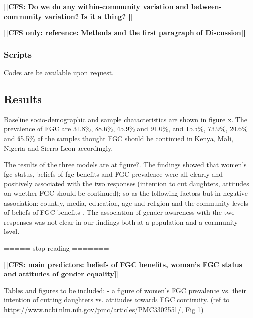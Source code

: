\documentclass[12pt,]{article}
\newcommand{\comment}[1]{\textbf{[[#1]]}}
\newcommand{\cfcmt}[1]{\comment{CFS: #1}}
\newcommand{\cfonly}[1]{\comment{CFS only: #1}}
\begin{document}
\cfcmt{Do we do any within-community variation and between-community variation?  Is it a thing? }

\cfonly{reference: Methods and the first paragraph of Discussion\cite{Chia14}}


\subsubsection{Scripts}\label{scripts}

Codes are be available upon request. 

\subsection{Results}\label{results-1}


Baseline socio-demographic and sample characteristics are shown in figure x.  The prevalence of FGC are 31.8\%, 88.6\%, 45.9\% and 91.0\%, and 15.5\%, 73.9\%, 20.6\% and 65.5\% of the samples thought FGC should be continued in Kenya, Mali, Nigeria and Sierra Leon accordingly.  

The results of the three models are at figure?.  The findings showed that women’s fgc status, beliefs of fgc benefits and FGC prevalence were all clearly and positively associated with the two responses (intention to cut daughters, attitudes on whether FGC should be continued); so as the following factors but in negative association:  country, media, education, age and religion and the community levels of beliefs of FGC benefits .  The association of gender awareness with the two responses was not clear in our findings both at a population  and a community level.

===== stop reading =======

\cfcmt{main predictors:  beliefs of FGC benefits, woman's FGC status and attitudes of gender equality}

Tables and figures to be included:
- a figure of women’s FGC prevalence vs. their intention of cutting daughters vs. attitudes towards FGC continuity.  (ref to \url{https://www.ncbi.nlm.nih.gov/pmc/articles/PMC3302551/}, Fig 1)
\end{document}
